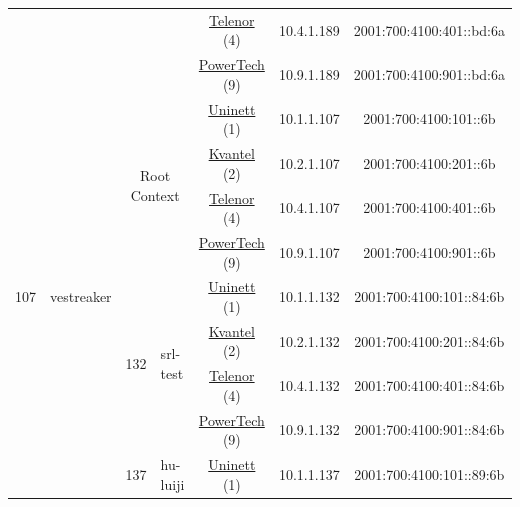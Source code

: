 \begin{small}
\begin{center}
\begin{longtable}{|c|c|c|c|c|c|c|c|}
  &  &  &  & \multicolumn{2}{|c|}{\tiny{\href{https://www.telenor.no}{Telenor} (4)}} & \tiny{10.4.1.189} & \tiny{2001:700:4100:401::bd:6a} \\* \cline{5-5}\cline{6-6}\cline{7-7}\cline{8-8}
  &  &  &  & \multicolumn{2}{|c|}{\tiny{\href{http://www.powertech.no}{PowerTech} (9)}} & \tiny{10.9.1.189} & \tiny{2001:700:4100:901::bd:6a} \\ \hline
 \multirow{28}{*}{\tiny{107}} & \multicolumn{1}{|l|}{\multirow{28}{*}{\tiny{vestreaker}}} & \multicolumn{2}{|c|}{\multirow{4}{*}{\tiny{Root Context}}} & \multicolumn{2}{|c|}{\tiny{\href{https://www.uninett.no}{Uninett} (1)}} & \tiny{10.1.1.107} & \tiny{2001:700:4100:101::6b} \\* \cline{5-5}\cline{6-6}\cline{7-7}\cline{8-8}
  &  & \multicolumn{2}{|c|}{} & \multicolumn{2}{|c|}{\tiny{\href{http://kvantel.no}{Kvantel} (2)}} & \tiny{10.2.1.107} & \tiny{2001:700:4100:201::6b} \\* \cline{5-5}\cline{6-6}\cline{7-7}\cline{8-8}
  &  & \multicolumn{2}{|c|}{} & \multicolumn{2}{|c|}{\tiny{\href{https://www.telenor.no}{Telenor} (4)}} & \tiny{10.4.1.107} & \tiny{2001:700:4100:401::6b} \\* \cline{5-5}\cline{6-6}\cline{7-7}\cline{8-8}
  &  & \multicolumn{2}{|c|}{} & \multicolumn{2}{|c|}{\tiny{\href{http://www.powertech.no}{PowerTech} (9)}} & \tiny{10.9.1.107} & \tiny{2001:700:4100:901::6b} \\* \cline{3-3}\cline{4-4}\cline{5-5}\cline{6-6}\cline{7-7}\cline{8-8}
  &  & \multirow{4}{*}{\tiny{132}} & \multicolumn{1}{|l|}{\multirow{4}{*}{\tiny{srl-test}}} & \multicolumn{2}{|c|}{\tiny{\href{https://www.uninett.no}{Uninett} (1)}} & \tiny{10.1.1.132} & \tiny{2001:700:4100:101::84:6b} \\* \cline{5-5}\cline{6-6}\cline{7-7}\cline{8-8}
  &  &  &  & \multicolumn{2}{|c|}{\tiny{\href{http://kvantel.no}{Kvantel} (2)}} & \tiny{10.2.1.132} & \tiny{2001:700:4100:201::84:6b} \\* \cline{5-5}\cline{6-6}\cline{7-7}\cline{8-8}
  &  &  &  & \multicolumn{2}{|c|}{\tiny{\href{https://www.telenor.no}{Telenor} (4)}} & \tiny{10.4.1.132} & \tiny{2001:700:4100:401::84:6b} \\* \cline{5-5}\cline{6-6}\cline{7-7}\cline{8-8}
  &  &  &  & \multicolumn{2}{|c|}{\tiny{\href{http://www.powertech.no}{PowerTech} (9)}} & \tiny{10.9.1.132} & \tiny{2001:700:4100:901::84:6b} \\* \cline{3-3}\cline{4-4}\cline{5-5}\cline{6-6}\cline{7-7}\cline{8-8}
  &  & \multirow{4}{*}{\tiny{137}} & \multicolumn{1}{|l|}{\multirow{4}{*}{\tiny{hu-luiji}}} & \multicolumn{2}{|c|}{\tiny{\href{https://www.uninett.no}{Uninett} (1)}} & \tiny{10.1.1.137} & \tiny{2001:700:4100:101::89:6b} \\* \cline{5-5}\cline{6-6}\cline{7-7}\cline{8-8}

\end{longtable}
\end{center}
\end{small}
